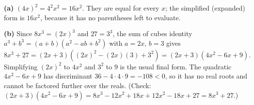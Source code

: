 \textbf{(a)} $(4x)^2=4^2x^2=16x^2$. They are equal for every $x$; the simplified (expanded) form is $16x^2$, because it has no parentheses left to evaluate.

\textbf{(b)} Since $8x^3=(2x)^3$ and $27=3^3$, the sum of cubes identity $a^3+b^3=(a+b)(a^2-ab+b^2)$ with $a=2x$, $b=3$ gives
\[8x^3+27=(2x+3)\left((2x)^2-(2x)(3)+3^2\right)=\boxed{(2x+3)(4x^2-6x+9)}.\]
Simplifying $(2x)^2$ to $4x^2$ and $3^2$ to $9$ is the usual final form. The quadratic $4x^2-6x+9$ has discriminant $36-4\cdot4\cdot9=-108<0$, so it has no real roots and cannot be factored further over the reals. (Check: $(2x+3)(4x^2-6x+9)=8x^3-12x^2+18x+12x^2-18x+27=8x^3+27$.)
